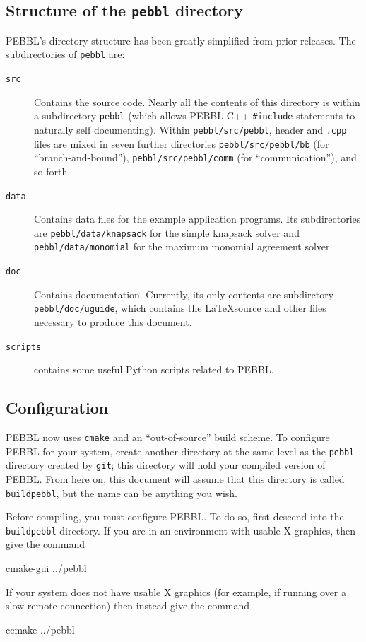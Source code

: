 \subsection{Structure of the \texttt{pebbl} directory}
\label{sec:dirstruct}
PEBBL's directory structure has been greatly simplified from prior releases.
The subdirectories of \texttt{pebbl} are:
\begin{description}
\item[\texttt{src}]  Contains the source code.  Nearly all the contents of
this directory is within a subdirectory \texttt{pebbl} (which allows PEBBL C++
\texttt{\#include} statements to naturally self documenting).  Within
\texttt{pebbl/src/pebbl}, header and \texttt{.cpp} files are mixed in seven
further directories \texttt{pebbl/src/pebbl/bb} (for ``branch-and-bound''),
\texttt{pebbl/src/pebbl/comm} (for ``communication''), and so forth.
\item[\texttt{data}] Contains data files for the example application programs.
Its subdirectories are \texttt{pebbl/\linebreak[1]data/knapsack} for the
simple knapsack solver and \texttt{pebbl/data/monomial} for the maximum
monomial agreement solver.
\item[\texttt{doc}] Contains documentation.  Currently, its only contents are subdirctory \texttt{pebbl/doc/uguide}, which contains the \LaTeX source and other files necessary to produce this document.
\item[\texttt{scripts}] contains some useful Python scripts related to PEBBL.
\end{description}


\subsection{Configuration}
\label{sec:configure}
PEBBL now uses \texttt{cmake} and an ``out-of-source'' build scheme.  To
configure PEBBL for your system, create another directory at the same level as
the \texttt{pebbl} directory created by \texttt{git}; this directory will hold
your compiled version of PEBBL.  From here on, this document will assume that
this directory is called \texttt{buildpebbl}, but the name can be anything you
wish.

Before compiling, you must configure PEBBL.  To do so, first descend into the
\texttt{buildpebbl} directory.  If you are in an environment with usable X
graphics, then give the command
\begin{codeblock}
cmake-gui ../pebbl
\end{codeblock}
If your system does not have usable X graphics (for example, if running over a
slow remote connection) then instead give the command
\begin{codeblock}
ccmake ../pebbl
\end{codeblock}

